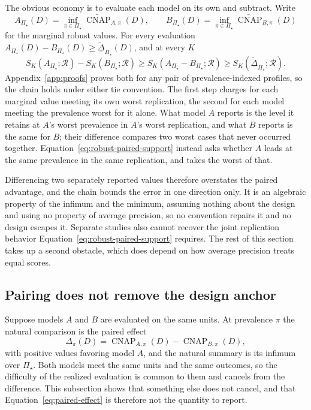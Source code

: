 \documentclass[11pt]{article}
\newcommand{\CNAP}{\operatorname{CNAP}}
\newcommand{\Regime}{\mathcal{R}}
\newcommand{\PSet}{\Pi_\star}
\newcommand{\CNAPta}{\widetilde{\CNAP}}
\newcommand{\RobDta}{\underline{\widetilde{\Delta}}_{\PSet}}
\theoremstyle{remark}
\begin{document}
The obvious economy is to evaluate each model on its own and subtract. Write
\[
A_{\PSet}(D)
=
\inf_{\pi\in\PSet}\CNAPta_{A,\pi}(D),
\qquad
B_{\PSet}(D)
=
\inf_{\pi\in\PSet}\CNAPta_{B,\pi}(D)
\]
for the marginal robust values. For every evaluation $A_{\PSet}(D)-B_{\PSet}(D)\geq\RobDta(D)$, and at every $K$
\begin{equation}
S_K(A_{\PSet};\Regime)
-
S_K(B_{\PSet};\Regime)
\geq
S_K(A_{\PSet}-B_{\PSet};\Regime)
\geq
S_K(\RobDta;\Regime).
\label{eq:robust-marginal-order}
\end{equation}
Appendix~\ref{app:proofs} proves both for any pair of prevalence-indexed profiles, so the chain holds under either tie convention. The first step charges for each marginal value meeting its own worst replication, the second for each model meeting the prevalence worst for it alone. What model $A$ reports is the level it retains at $A$'s worst prevalence in $A$'s worst replication, and what $B$ reports is the same for $B$; their difference compares two worst cases that never occurred together. Equation~\eqref{eq:robust-paired-support} instead asks whether $A$ leads at the same prevalence in the same replication, and takes the worst of that.

Differencing two separately reported values therefore overstates the paired advantage, and the chain bounds the error in one direction only. It is an algebraic property of the infimum and the minimum, assuming nothing about the design and using no property of average precision, so no convention repairs it and no design escapes it. Separate studies also cannot recover the joint replication behavior Equation~\eqref{eq:robust-paired-support} requires. The rest of this section takes up a second obstacle, which does depend on how average precision treats equal scores.

\subsection{Pairing does not remove the design anchor}
\label{sec:paired-anchor}

Suppose models $A$ and $B$ are evaluated on the same units. At prevalence $\pi$ the natural comparison is the paired effect
\begin{equation}
\Delta_\pi(D)
=
\CNAP_{A,\pi}(D)
-
\CNAP_{B,\pi}(D),
\label{eq:paired-effect}
\end{equation}
with positive values favoring model $A$, and the natural summary is its infimum over $\PSet$. Both models meet the same units and the same outcomes, so the difficulty of the realized evaluation is common to them and cancels from the difference. This subsection shows that something else does not cancel, and that Equation~\eqref{eq:paired-effect} is therefore not the quantity to report.
\end{document}

